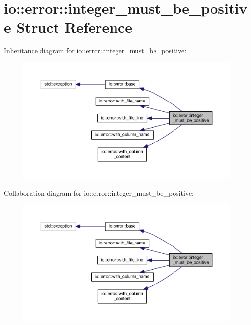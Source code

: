 \section{io\+:\+:error\+:\+:integer\+\_\+must\+\_\+be\+\_\+positive Struct Reference}
\label{structio_1_1error_1_1integer__must__be__positive}


Inheritance diagram for io\+:\+:error\+:\+:integer\+\_\+must\+\_\+be\+\_\+positive\+:\nopagebreak
\begin{figure}[H]
\begin{center}
\leavevmode
\includegraphics[width=350pt]{structio_1_1error_1_1integer__must__be__positive__inherit__graph}
\end{center}
\end{figure}


Collaboration diagram for io\+:\+:error\+:\+:integer\+\_\+must\+\_\+be\+\_\+positive\+:\nopagebreak
\begin{figure}[H]
\begin{center}
\leavevmode
\includegraphics[width=350pt]{structio_1_1error_1_1integer__must__be__positive__coll__graph}
\end{center}
\end{figure}

